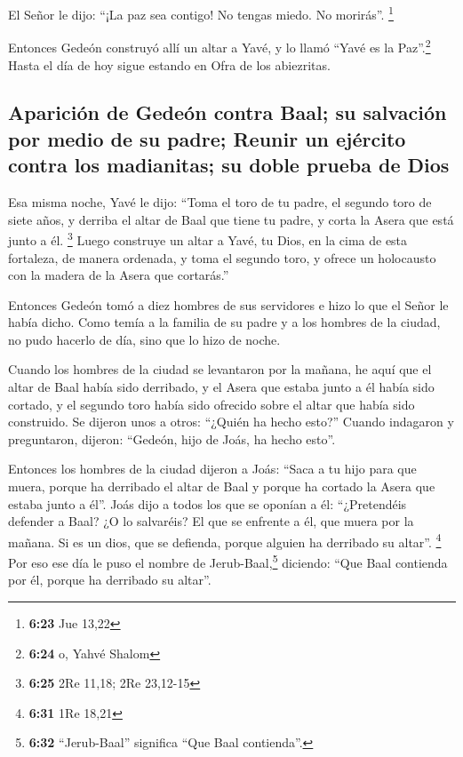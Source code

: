\begin{paracol}{2}
 El Señor le dijo: ``¡La paz sea contigo! No tengas
miedo. No morirás''. \footnote{\textbf{6:23} Jue 13,22}

 Entonces Gedeón construyó allí un altar a Yavé, y lo
llamó ``Yavé es la Paz''.\footnote{\textbf{6:24} o, Yahvé Shalom} Hasta
el día de hoy sigue estando en Ofra de los abiezritas.

\hypertarget{apariciuxf3n-de-gedeuxf3n-contra-baal-su-salvaciuxf3n-por-medio-de-su-padre-reunir-un-ejuxe9rcito-contra-los-madianitas-su-doble-prueba-de-dios}{%
\subsection{Aparición de Gedeón contra Baal; su salvación por medio de
su padre; Reunir un ejército contra los madianitas; su doble prueba de
Dios}\label{apariciuxf3n-de-gedeuxf3n-contra-baal-su-salvaciuxf3n-por-medio-de-su-padre-reunir-un-ejuxe9rcito-contra-los-madianitas-su-doble-prueba-de-dios}}

 Esa misma noche, Yavé le dijo: ``Toma el toro de tu
padre, el segundo toro de siete años, y derriba el altar de Baal que
tiene tu padre, y corta la Asera que está junto a él. \footnote{\textbf{6:25}
  2Re 11,18; 2Re 23,12-15}  Luego construye un altar a
Yavé, tu Dios, en la cima de esta fortaleza, de manera ordenada, y toma
el segundo toro, y ofrece un holocausto con la madera de la Asera que
cortarás.''

 Entonces Gedeón tomó a diez hombres de sus servidores e
hizo lo que el Señor le había dicho. Como temía a la familia de su padre
y a los hombres de la ciudad, no pudo hacerlo de día, sino que lo hizo
de noche.

 Cuando los hombres de la ciudad se levantaron por la
mañana, he aquí que el altar de Baal había sido derribado, y el Asera
que estaba junto a él había sido cortado, y el segundo toro había sido
ofrecido sobre el altar que había sido construido.  Se
dijeron unos a otros: ``¿Quién ha hecho esto?'' Cuando indagaron y
preguntaron, dijeron: ``Gedeón, hijo de Joás, ha hecho esto''.

 Entonces los hombres de la ciudad dijeron a Joás: ``Saca
a tu hijo para que muera, porque ha derribado el altar de Baal y porque
ha cortado la Asera que estaba junto a él''.  Joás dijo a
todos los que se oponían a él: ``¿Pretendéis defender a Baal? ¿O lo
salvaréis? El que se enfrente a él, que muera por la mañana. Si es un
dios, que se defienda, porque alguien ha derribado su altar''.
\footnote{\textbf{6:31} 1Re 18,21}  Por eso ese día le
puso el nombre de Jerub-Baal,\footnote{\textbf{6:32} ``Jerub-Baal''
  significa ``Que Baal contienda''.} diciendo: ``Que Baal contienda por
él, porque ha derribado su altar''.


\end{paracol}
